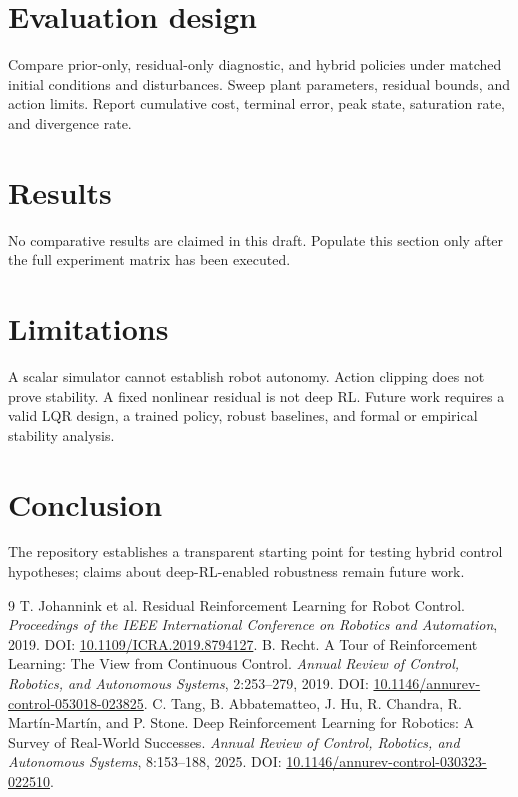 \documentclass[11pt]{article}
\begin{document}
\section{Evaluation design}
Compare prior-only, residual-only diagnostic, and hybrid policies under matched initial conditions and disturbances. Sweep plant parameters, residual bounds, and action limits. Report cumulative cost, terminal error, peak state, saturation rate, and divergence rate.
\section{Results}
No comparative results are claimed in this draft. Populate this section only after the full experiment matrix has been executed.
\section{Limitations}
A scalar simulator cannot establish robot autonomy. Action clipping does not prove stability. A fixed nonlinear residual is not deep RL. Future work requires a valid LQR design, a trained policy, robust baselines, and formal or empirical stability analysis.
\section{Conclusion}
The repository establishes a transparent starting point for testing hybrid control hypotheses; claims about deep-RL-enabled robustness remain future work.
\begin{thebibliography}{9}
 T. Johannink et al. Residual Reinforcement Learning for Robot Control. \textit{Proceedings of the IEEE International Conference on Robotics and Automation}, 2019. DOI: \href{https://doi.org/10.1109/ICRA.2019.8794127}{10.1109/ICRA.2019.8794127}.
 B. Recht. A Tour of Reinforcement Learning: The View from Continuous Control. \textit{Annual Review of Control, Robotics, and Autonomous Systems}, 2:253--279, 2019. DOI: \href{https://doi.org/10.1146/annurev-control-053018-023825}{10.1146/annurev-control-053018-023825}.
 C. Tang, B. Abbatematteo, J. Hu, R. Chandra, R. Martín-Martín, and P. Stone. Deep Reinforcement Learning for Robotics: A Survey of Real-World Successes. \textit{Annual Review of Control, Robotics, and Autonomous Systems}, 8:153--188, 2025. DOI: \href{https://doi.org/10.1146/annurev-control-030323-022510}{10.1146/annurev-control-030323-022510}.
\end{thebibliography}
\end{document}
